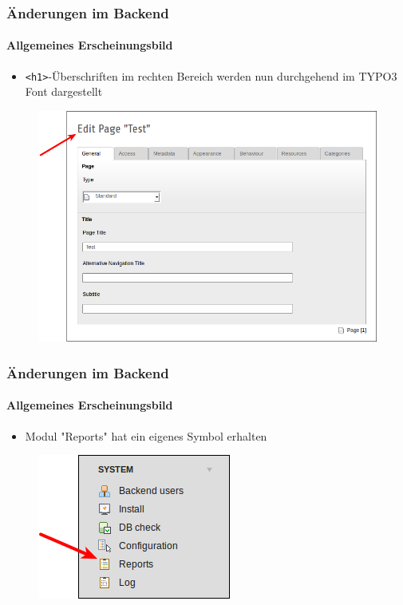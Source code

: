 
\begin{frame}[fragile]
	\frametitle{Änderungen im Backend}
	\framesubtitle{Allgemeines Erscheinungsbild}

	\begin{itemize}
		\item \texttt{<h1>}-Überschriften im rechten Bereich werden nun durchgehend im TYPO3 Font dargestellt
	\end{itemize}

	\begin{figure}
		\includegraphics[width=0.6\linewidth]{Images/BackendChanges/ConsistantFont.png}
	\end{figure}

\end{frame}


\begin{frame}[fragile]
	\frametitle{Änderungen im Backend}
	\framesubtitle{Allgemeines Erscheinungsbild}

	\begin{itemize}
		\item Modul "Reports" hat ein eigenes Symbol erhalten
	\end{itemize}

	\begin{figure}
		\includegraphics[width=0.35\linewidth]{Images/BackendChanges/ModuleReportsIcon.png}
	\end{figure}

\end{frame}

